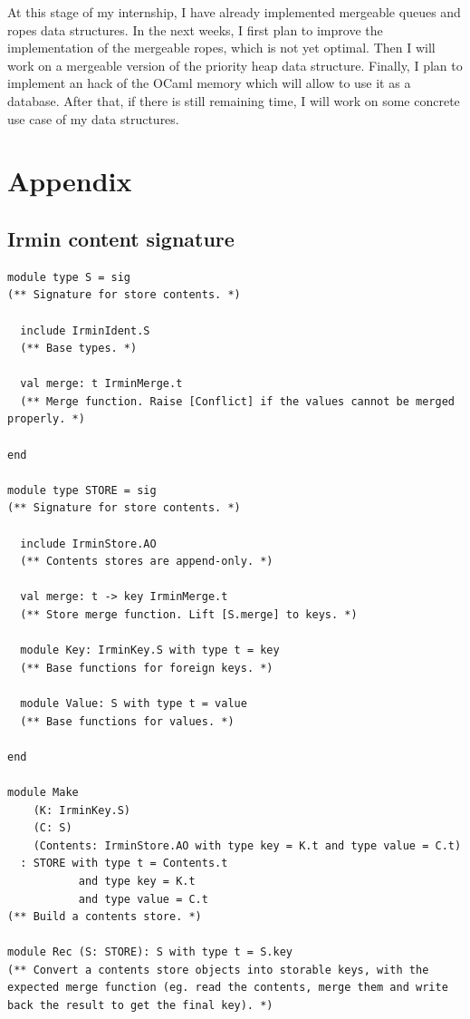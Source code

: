 \documentclass{article}
\renewcommand{\-}{\hyp}
\newcommand{\irmin}{Irmin\xspace}
\newcommand{\ocaml}{OCaml\xspace}
\begin{document}
At this stage of my internship, I have already implemented mergeable queues and ropes data structures.
In the next weeks, I first plan to improve the implementation of the mergeable ropes, which is not yet optimal.
Then I will work on a mergeable version of the priority heap data structure.
Finally, I plan to implement an hack of the \ocaml memory which will allow to use it as a database.
After that, if there is still remaining time, I will work on some concrete use case of my data structures.

\nocite{*}


\newpage

\section*{Appendix}
\addtocounter{section}{1}
\setcounter{subsection}{0}
\renewcommand{\thesubsection}{\Alph{subsection}}

\subsection{\irmin content signature\label{appendixcontent}}
\begin{lstlisting}
module type S = sig
(** Signature for store contents. *)

  include IrminIdent.S
  (** Base types. *)

  val merge: t IrminMerge.t
  (** Merge function. Raise [Conflict] if the values cannot be merged properly. *)

end

module type STORE = sig
(** Signature for store contents. *)

  include IrminStore.AO
  (** Contents stores are append-only. *)

  val merge: t -> key IrminMerge.t
  (** Store merge function. Lift [S.merge] to keys. *)

  module Key: IrminKey.S with type t = key
  (** Base functions for foreign keys. *)

  module Value: S with type t = value
  (** Base functions for values. *)

end

module Make
    (K: IrminKey.S)
    (C: S)
    (Contents: IrminStore.AO with type key = K.t and type value = C.t)
  : STORE with type t = Contents.t
           and type key = K.t
           and type value = C.t
(** Build a contents store. *)

module Rec (S: STORE): S with type t = S.key
(** Convert a contents store objects into storable keys, with the expected merge function (eg. read the contents, merge them and write back the result to get the final key). *)
\end{lstlisting}
\end{document}
